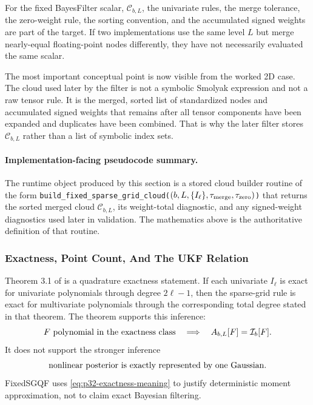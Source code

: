 \documentclass[11pt]{article}
\numberwithin{equation}{section}
\begin{document}
For the fixed BayesFilter scalar, \(\mathcal C_{b,L}\), the univariate
rules, the merge tolerance, the zero-weight rule, the sorting convention, and
the accumulated signed weights are part of the target.  If two implementations
use the same level \(L\) but merge nearly-equal floating-point nodes
differently, they have not necessarily evaluated the same scalar.

The most important conceptual point is now visible from the worked 2D case.
The cloud used later by the filter is not a symbolic Smolyak expression and not
a raw tensor rule.  It is the merged, sorted list of standardized nodes and
accumulated signed weights that remains after all tensor components have been
expanded and duplicates have been combined.  That is why the later filter stores
\(\mathcal C_{b,L}\) rather than a list of symbolic index sets.

\paragraph{Implementation-facing pseudocode summary.}
The runtime object produced by this section is a stored cloud builder routine of
the form \texttt{build\_fixed\_sparse\_grid\_cloud(}$(b,L,\{I_\ell\},\tau_{\rm merge},\tau_{\rm zero})$\texttt{)}
that returns the sorted merged cloud \(\mathcal C_{b,L}\), its weight-total
diagnostic, and any signed-weight diagnostics used later in validation.  The
mathematics above is the authoritative definition of that routine.

\subsubsection{Exactness, Point Count, And The UKF Relation}
\label{subsec:p32-source-theorems}

Theorem 3.1 of \citet{jia2012sparsegrid} is a quadrature exactness statement.
If each univariate \(I_\ell\) is exact for univariate polynomials through
degree \(2\ell-1\), then the sparse-grid rule is exact for multivariate
polynomials through the corresponding total degree stated in that theorem.
The theorem supports this inference:
\begin{equation}
  F\ \hbox{polynomial in the exactness class}
  \quad\Longrightarrow\quad
  A_{b,L}[F]=\mathcal I_b[F].
  \label{eq:p32-exactness-meaning}
\end{equation}
It does not support the stronger inference
\[
  \hbox{nonlinear posterior is exactly represented by one Gaussian}.
\]
FixedSGQF uses \eqref{eq:p32-exactness-meaning} to justify deterministic
moment approximation, not to claim exact Bayesian filtering.
\end{document}
